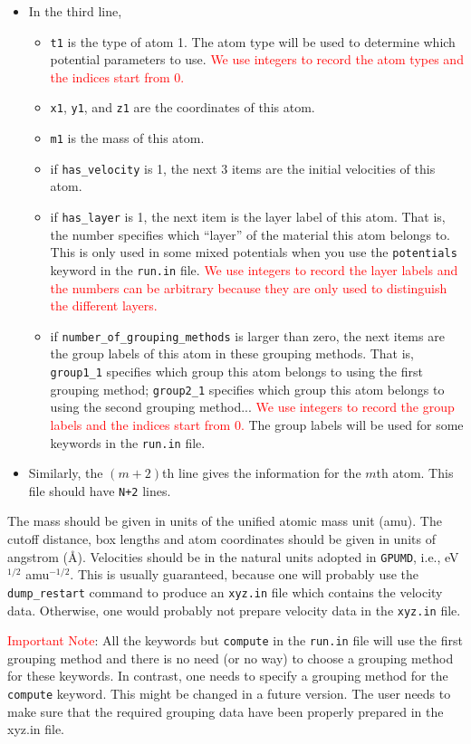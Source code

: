 \documentclass[12pt,a4paper]{report}
\begin{document}
\begin{itemize}
\item In the third line, 
\begin{itemize}
\item \verb"t1" is the type of atom 1. The atom type will be used to determine which potential parameters to use. \textcolor{red}{We use integers to record the atom types and the indices start from 0.}
\item \verb"x1", \verb"y1", and \verb"z1" are the coordinates of this atom.
\item  \verb"m1" is the mass of this atom.
\item if  \verb"has_velocity" is 1, the next 3 items are the initial velocities of this atom.
\item if \verb"has_layer" is 1, the next item is the layer label of this atom. That is, the number specifies which ``layer'' of the material this atom belongs to. This is only used in some mixed potentials when you use the \verb"potentials" keyword in the \verb"run.in" file.  \textcolor{red}{We use integers to record the layer labels and the numbers can be arbitrary because they are only used to distinguish the different layers.}
\item if \verb"number_of_grouping_methods" is larger than zero, the next items are the group labels of this atom in these grouping methods. That is, \verb"group1_1" specifies which group this atom belongs to using the first grouping method; \verb"group2_1" specifies which group this atom belongs to using the second grouping method... \textcolor{red}{We use integers to record the group labels and the indices start from 0.} The group labels will be used for some keywords in the \verb"run.in" file. 
\end{itemize}
\item Similarly, the $(m+2)$th line gives the information for the $m$th atom. This file should have \verb"N+2" lines.
\end{itemize}

The mass should be given in units of the unified atomic mass unit (amu). The cutoff distance, box lengths and atom coordinates should be given in units of angstrom (\AA). Velocities should be in the natural units adopted in \verb"GPUMD", i.e., eV$^{1/2}$ amu$^{-1/2}$. This is usually guaranteed, because one will probably use the \verb"dump_restart" command to produce an \verb"xyz.in" file which contains the velocity data. Otherwise, one would probably not prepare velocity data in the \verb"xyz.in" file.

\textcolor{red}{Important Note}: All the keywords but \verb"compute" in the \verb"run.in" file will use the first grouping method and there is no need (or no way) to choose a grouping method for these keywords. In contrast, one needs to specify a grouping method for the \verb"compute" keyword. This might be changed in a future version. The user needs to make sure that the required grouping data have been properly prepared in the xyz.in file.
\end{document}

